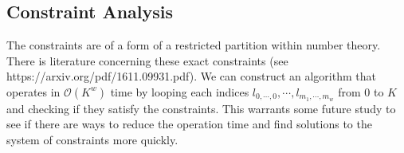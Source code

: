 \subsection{Constraint Analysis}

The constraints are of a form of a restricted partition within number theory. There is literature concerning these exact constraints (see https://arxiv.org/pdf/1611.09931.pdf). We can construct an algorithm that operates in $\mathcal{O}(K^w)$ time by looping each indices $l_{0, \cdots, 0}, \cdots, l_{m_1, \cdots, m_w}$ from $0$ to $K$ and checking if they satisfy the constraints. This warrants some future study to see if there are ways to reduce the operation time and find solutions to the system of constraints more quickly.

